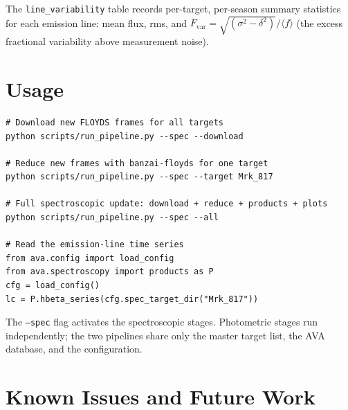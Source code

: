 \documentclass[a4paper,12pt]{article}
\begin{document}
The \texttt{line\_variability} table records per-target, per-season summary
statistics for each emission line: mean flux, rms, and
$F_\mathrm{var} = \sqrt{(\sigma^2 - \delta^2)} / \langle f \rangle$ (the
excess fractional variability above measurement noise).

\section{Usage}
\label{sec:usage}

\begin{lstlisting}[style=shell]
# Download new FLOYDS frames for all targets
python scripts/run_pipeline.py --spec --download

# Reduce new frames with banzai-floyds for one target
python scripts/run_pipeline.py --spec --target Mrk_817

# Full spectroscopic update: download + reduce + products + plots
python scripts/run_pipeline.py --spec --all

# Read the emission-line time series
from ava.config import load_config
from ava.spectroscopy import products as P
cfg = load_config()
lc = P.hbeta_series(cfg.spec_target_dir("Mrk_817"))
\end{lstlisting}

\begin{warnbox}
The \texttt{--spec} flag activates the spectroscopic stages.  Photometric
stages run independently; the two pipelines share only the master target
list, the AVA database, and the  configuration.
\end{warnbox}

\section{Known Issues and Future Work}
\label{sec:future}
\end{document}
